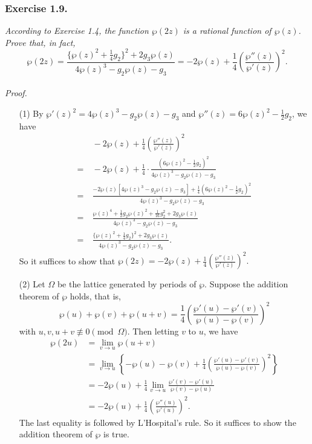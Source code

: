 \documentclass{article}
\begin{document}



\subsubsection*{Exercise 1.9.}
\emph{According to Exercise 1.4, the function $\wp(2z)$ is a rational function of $\wp(z)$.
Prove that, in fact,}
\[
  \wp(2z)
  =
  \frac{\{ \wp(z)^2 + \frac{1}{4} g_2 \}^2 + 2 g_3 \wp(z)}{4 \wp(z)^3 - g_2 \wp(z) - g_3}
  =
  - 2 \wp(z) + \frac{1}{4}\left( \frac{\wp''(z)}{\wp'(z)} \right)^2.
\] \\



\emph{Proof.}
\begin{enumerate}
\item[(1)]
  By $\wp'(z)^2 = 4 \wp(z)^3 - g_2 \wp(z) - g_3$ and $\wp''(z) = 6\wp(z)^2 - \frac{1}{2} g_2$,
  we have
  \begin{align*}
    & \:
    - 2 \wp(z) + \frac{1}{4}\left( \frac{\wp''(z)}{\wp'(z)} \right)^2 \\
    = &\: 
    - 2 \wp(z) + \frac{1}{4} \cdot \frac{(6\wp(z)^2 - \frac{1}{2} g_2)^2}{4 \wp(z)^3 - g_2 \wp(z) - g_3} \\
    = &\: 
    \frac{- 2 \wp(z)[4 \wp(z)^3 - g_2 \wp(z) - g_3] + \frac{1}{4}(6\wp(z)^2 - \frac{1}{2} g_2)^2}
      {4 \wp(z)^3 - g_2 \wp(z) - g_3} \\
    = &\: 
    \frac{\wp(z)^4 + \frac{1}{2} g_2 \wp(z)^2 + \frac{1}{16}g_2^2 + 2 g_3 \wp(z)}
      {4 \wp(z)^3 - g_2 \wp(z) - g_3} \\
    = &\: 
    \frac{\{ \wp(z)^2 + \frac{1}{4}g_2 \}^2 + 2 g_3 \wp(z)}
      {4 \wp(z)^3 - g_2 \wp(z) - g_3}.
  \end{align*}
  So it suffices to show that
  $\wp(2z) = - 2 \wp(z) + \frac{1}{4}\left( \frac{\wp''(z)}{\wp'(z)} \right)^2.$

\item[(2)]
  Let $\Omega$ be the lattice generated by periods of $\wp$.
  Suppose the addition theorem of $\wp$ holds, that is,
  \[
    \wp(u) + \wp(v) + \wp(u+v)
    =
    \frac{1}{4}\left( \frac{\wp'(u)-\wp'(v)}{\wp(u)-\wp(v)} \right)^2
  \]
  with $u, v, u+v \not\equiv 0 \pmod{\Omega}$.
  Then letting $v$ to $u$, we have
  \begin{align*}
    \wp(2u)
    &= \lim_{v \to u} \wp(u + v) \\
    &= \lim_{v \to u}
      \left\{ -\wp(u)-\wp(v)+\frac{1}{4}\left( \frac{\wp'(u)-\wp'(v)}{\wp(u)-\wp(v)} \right)^2 \right\} \\
    &= -2\wp(u) + \frac{1}{4} \lim_{v \to u} \frac{\wp'(v)-\wp'(u)}{\wp(v)-\wp(u)} \\
    &=  -2\wp(u) + \frac{1}{4}\left( \frac{\wp''(u)}{\wp'(u)} \right)^2.
  \end{align*}
  The last equality is followed by L'Hospital's rule.
  So it suffices to show the addition theorem of $\wp$ is true.


\end{enumerate}
\end{document}
